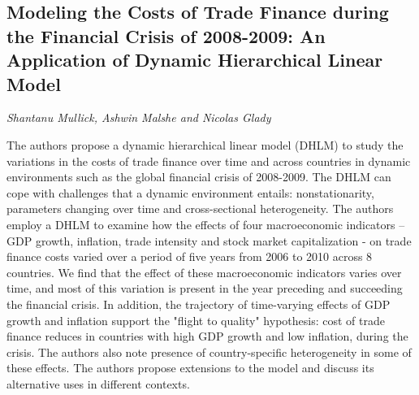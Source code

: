 \documentclass[../booklet.tex]{subfiles}
\begin{document}
\subsection[Modeling the Costs of Trade Finance during the Financial Crisis of 2008-2009: An Application of Dynamic Hierarchical Linear Model. {\it Shantanu Mullick, Ashwin Malshe and Nicolas Glady}]{Modeling the Costs of Trade Finance during the Financial Crisis of 2008-2009: An Application of Dynamic Hierarchical Linear Model}
  

\begin{center}
  {\it Shantanu Mullick, Ashwin Malshe and Nicolas Glady}
\end{center}

\vskip 0.8cm

The authors propose a dynamic hierarchical linear model (DHLM) to study the variations in the costs of trade finance over time and across countries in dynamic environments such as the global financial crisis of 2008-2009. The DHLM can cope with challenges that a dynamic environment entails: nonstationarity, parameters changing over time and cross-sectional heterogeneity. The authors employ a DHLM to examine how the effects of four macroeconomic indicators -- GDP growth, inflation, trade intensity and stock market capitalization - on trade finance costs varied over a period of five years from 2006 to 2010 across 8 countries. We find that the effect of these macroeconomic indicators varies over time, and most of this variation is present in the year preceding and succeeding the financial crisis. In addition, the trajectory of time-varying effects of GDP growth and inflation support the "flight to quality" hypothesis: cost of trade finance reduces in countries with high GDP growth and low inflation, during the crisis. The authors also note presence of country-specific heterogeneity in some of these effects. The authors propose extensions to the model and discuss its alternative uses in different contexts.

\end{document}
